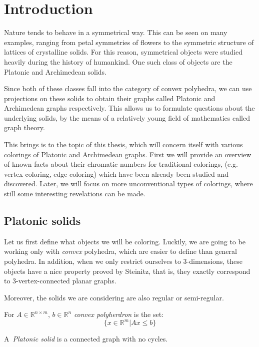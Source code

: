 \chapter*{Introduction}

Nature tends to behave in a symmetrical way. This can be seen on many examples, ranging from petal symmetries of flowers to the symmetric structure of lattices of crystalline solids. For this reason, symmetrical objects were studied heavily during the history of humankind. One such class of objects are the Platonic and Archimedean solids.

Since both of these classes fall into the category of convex polyhedra, we can use projections on these solids to obtain their graphs called Platonic and Archimedean graphs respectively. This allows us to formulate questions about the underlying solids, by the means of a relatively young field of mathematics called graph theory.

This brings is to the topic of this thesis, which will concern itself with various colorings of Platonic and Archimedean graphs. First we will provide an overview of known facts about their chromatic numbers for traditional colorings, (e.g. vertex coloring, edge coloring) which have been already been studied and discovered. Later, we will focus on more unconventional types of colorings, where still some interesting revelations can be made.

\section{Platonic solids}

Let us first define what objects we will be coloring. Luckily, we are going to be working only with \emph{convex} polyhedra, which are easier to define than general polyhedra. In addition, when we only restrict ourselves to 3-dimensions, these objects have a nice property proved by Steinitz, that is, they exactly correspond to 3-vertex-connected planar graphs.

Moreover, the solids we are considering are also regular or semi-regular.

\begin{define}
For $A\in\mathbb{R}^{n \times m}$, $b\in\mathbb{R}^n$ {\sl convex polyherdron} is the set:
\[
\{ x \in \mathbb{R}^m | Ax \leq b\}
\]
\end{define}

\begin{define}
A~{\sl Platonic solid} is a connected graph with no cycles.
\end{define}
